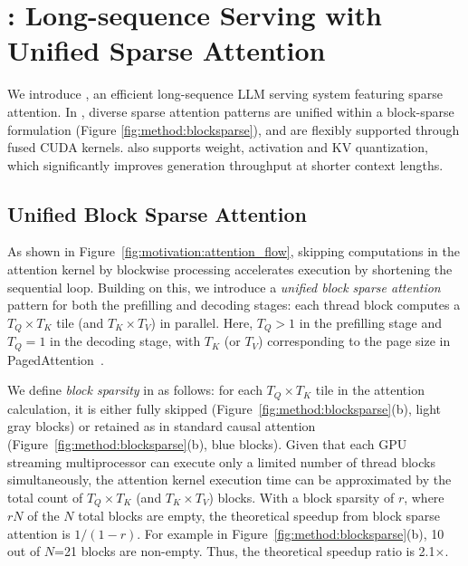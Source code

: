 
\section{\system: Long-sequence Serving with Unified Sparse Attention}
\label{sect:method}




We introduce \textbf{\system}, an efficient long-sequence LLM serving system featuring sparse attention. In \system, diverse sparse attention patterns are unified within a block-sparse formulation (Figure \ref{fig:method:blocksparse}), and are flexibly supported through fused CUDA kernels. \system also supports weight, activation and KV quantization, which significantly improves generation throughput at shorter context lengths. 

\subsection{Unified Block Sparse Attention}
\label{sect:method:blocksparse_overview}










As shown in Figure~\ref{fig:motivation:attention_flow}, skipping computations in the attention kernel by blockwise processing accelerates execution by shortening the sequential loop.
Building on this, we introduce a \textit{unified block sparse attention} pattern for both the prefilling and decoding stages: each thread block computes a $T_Q \times T_K$ tile (and $T_K \times T_V$) in parallel. Here, $T_Q > 1$ in the prefilling stage and $T_Q = 1$ in the decoding stage, with $T_K$ (or $T_V$) corresponding to the page size in PagedAttention~\cite{kwon2023efficient}.

We define \textit{block sparsity} in \system as follows: for each $T_Q \times T_K$ tile in the attention calculation, it is either fully skipped (Figure~\ref{fig:method:blocksparse}(b), light gray blocks) or retained as in standard causal attention (Figure~\ref{fig:method:blocksparse}(b), blue blocks). Given that each GPU streaming multiprocessor can execute only a limited number of thread blocks simultaneously, the attention kernel execution time can be approximated by the total count of $T_Q \times T_K$ (and $T_K \times T_V$) blocks. With a block sparsity of $r$, where $rN$ of the $N$ total blocks are empty, the theoretical speedup from block sparse attention is $1 / (1 - r)$. For example in Figure~\ref{fig:method:blocksparse}(b), 10 out of $N$=21 blocks are non-empty. Thus, the theoretical speedup ratio is 2.1$\times$. 

